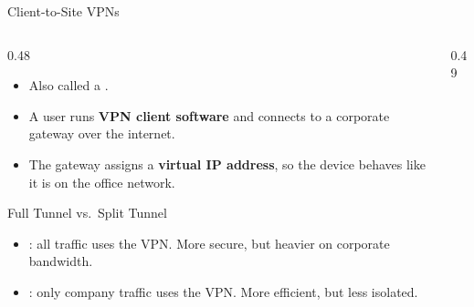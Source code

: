 \documentclass[aspectratio=169]{beamer}  %
\begin{document}
\begin{frame}[t]{Client-to-Site VPNs}
    \begin{columns}[T]
        \begin{column}{0.48\textwidth}
            \begin{itemize}
                \item Also called a .
                \item A user runs \textbf{VPN client software} and connects to a corporate gateway over the internet.
                \item The gateway assigns a \textbf{virtual IP address}, so the device behaves like it is on the office network.
            \end{itemize}
            \vspace{0.3em}
            \begin{block}{Full Tunnel vs.\ Split Tunnel}
                \begin{itemize}
                    \footnotesize
                    \item {}: all traffic uses the VPN. More secure, but heavier on corporate bandwidth.
                    \item {}: only company traffic uses the VPN. More efficient, but less isolated.
                \end{itemize}
            \end{block}
        \end{column}
        \begin{column}{0.49\textwidth}
            \begin{center}
\end{center}
\end{column}
\end{columns}
\end{frame}
\end{document}
